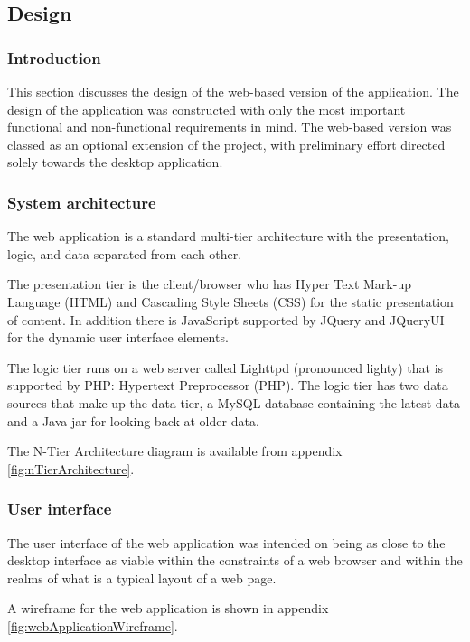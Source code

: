 \subsection{Design}

\subsubsection{Introduction}

This section discusses the design of the web-based version of the application.
The design of the application was constructed with only the most important
functional and non-functional requirements in mind. The web-based version was
classed as an optional extension of the project, with preliminary effort
directed solely towards the desktop application.

\subsubsection{System architecture}

The web application is a standard multi-tier architecture with the 
presentation, logic, and data separated from each other.

The presentation tier is the client/browser who has Hyper Text Mark-up Language
(HTML) and Cascading Style Sheets (CSS) for the static presentation of content.
In addition there is JavaScript supported by JQuery and JQueryUI for the dynamic
user interface elements.

The logic tier runs on a web server called Lighttpd (pronounced lighty) that is
supported by PHP: Hypertext Preprocessor (PHP). The logic tier has two data
sources that make up the data tier, a MySQL database containing the latest data
and a Java jar for looking back at older data.

The N-Tier Architecture diagram is available from appendix
\ref{fig:nTierArchitecture}.

\subsubsection{User interface}

The user interface of the web application was intended on being as close to the
desktop interface as viable within the constraints of a web browser and within
the realms of what is a typical layout of a web page.

A wireframe for the web application is shown in appendix
\ref{fig:webApplicationWireframe}.

